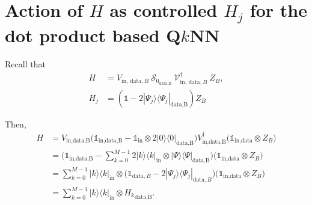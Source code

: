 \documentclass[a4paper,twocolumn,11pt,unpublished]{quantumarticle}
\newcommand{\rang}{\rangle}
\newcommand{\lang}{\langle}
\begin{document}
    
\section{Action of $H$ as controlled $H_j$ for the dot product based  Q$k$NN} \label{actH}
    Recall that
    \begin{equation}\begin{split}
        H &= V_{\text{in, data},B} \ \mathcal S_{0_{\text{data,B}}} \ \mathcal  V^\dag_{\text{in, data},B} \ Z_B,\\
        H_j &= (\mathds{1} - 2 |\Psi_j \rang \lang \Psi_j |_{\text{data,B}}) Z_B 
    \end{split}\end{equation}

    Then,
    \begin{equation}
        \begin{split}
            H &= V_{\text{in,data,B}}
            \Big(\mathds{1}_{\text{in,data,B}} - \mathds{1}_{\text{in}} \otimes 2 |0\rang \lang 0|_{\text{data,B}}\Big) V_{\text{in,data,B}} ^ {\dag} \Big(\mathds{1}_{\text{in,data}} \otimes Z_B\Big) \\
            &= \Big(\mathds{1}_{\text{in,data,B}}
            - \sum \limits_{k = 0} ^ {M - 1} 2 |k\rang \lang k|_{\text{in}} \otimes  |\Psi\rang  \lang \Psi |_{\text{data,B}} \Big)  \Big(\mathds{1}_{\text{in,data}} \otimes Z_B\Big) \\
            & =\sum \limits_{k = 0} ^ {M - 1} |k \rang \lang k |_{\text{in}} \otimes \Big( \mathds{1}_{\text{data},B} - 2 |\Psi_j \rang \lang \Psi_j |_{\text{data},B} \Big) \Big(\mathds{1}_{\text{in,data}} \otimes Z_B\Big) \\
            & =\sum \limits_{k = 0} ^ {M - 1} |k \rang \lang k |_{\text{in}} \otimes {H_k}_{\text{data,B}}.
        \end{split}
    \end{equation}    
 
\end{document}
